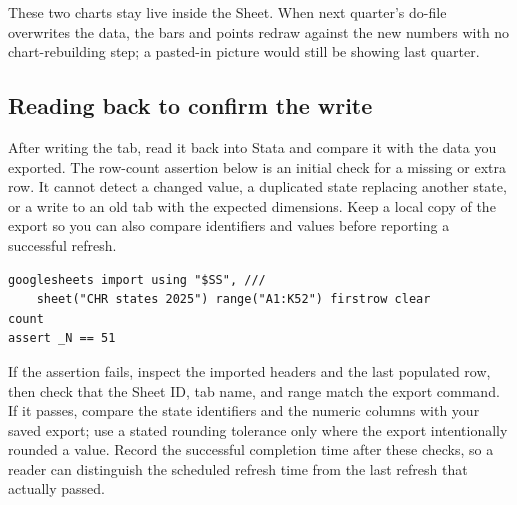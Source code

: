 \documentclass[
    a4paper,
    fontsize=10pt,
    twoside=true,
    numbers=noenddot,
]{kaobook}
\begin{document}
These two charts stay live inside the Sheet. When next quarter's do-file overwrites the data, the bars and points redraw against the new numbers with no chart-rebuilding step; a pasted-in picture would still be showing last quarter.

\subsection{Reading back to confirm the write}
After writing the tab, read it back into Stata and compare it with the data you exported. The row-count assertion below is an initial check for a missing or extra row. It cannot detect a changed value, a duplicated state replacing another state, or a write to an old tab with the expected dimensions. Keep a local copy of the export so you can also compare identifiers and values before reporting a successful refresh.
\par
{\footnotesize
\begin{verbatim}
googlesheets import using "$SS", ///
    sheet("CHR states 2025") range("A1:K52") firstrow clear
count
assert _N == 51
\end{verbatim}
}
If the assertion fails, inspect the imported headers and the last populated row, then check that the Sheet ID, tab name, and range match the export command. If it passes, compare the state identifiers and the numeric columns with your saved export; use a stated rounding tolerance only where the export intentionally rounded a value. Record the successful completion time after these checks, so a reader can distinguish the scheduled refresh time from the last refresh that actually passed.
\end{document}
